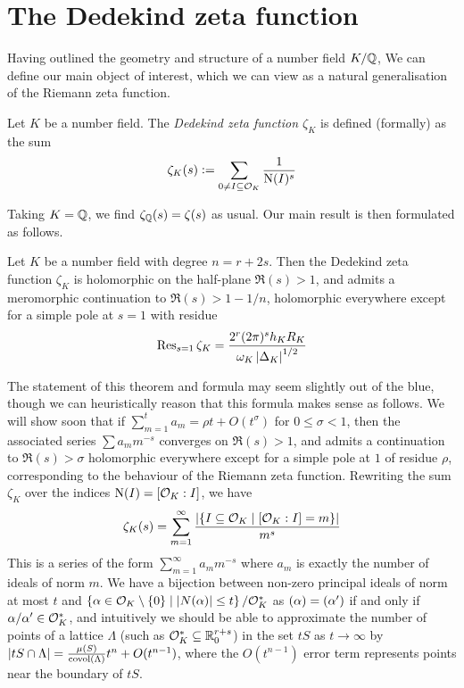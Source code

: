 \documentclass[11pt]{report}
\begin{document}
\section{The Dedekind zeta function}
Having outlined the geometry and structure of a number field $K / \mathbb{Q}$, We can define our main object of interest, which we can view as a natural generalisation of the Riemann zeta function.
\begin{definition}
    Let $K$ be a number field. The \emph{Dedekind zeta function $\zeta_K$} is defined (formally) as the sum
    $$
        \zeta_K(s) \vcentcolon= \sum_{0 \neq I \subseteq \mathcal{O}_K} \frac1{\operatorname{N}(I)^s}
    $$
\end{definition}
Taking $K = \mathbb{Q}$, we find $\zeta_{\mathbb{Q}}(s) = \zeta(s)$ as usual. Our main result is then formulated as follows.
\begin{theorem}\label{acnf1}
    Let $K$ be a number field with degree $n = r + 2s$. Then the Dedekind zeta function $\zeta_K$ is holomorphic on the half-plane $\Re(s) > 1$, and admits a meromorphic continuation to $\Re(s) > 1 - 1/n$, holomorphic everywhere except for a simple pole at $s = 1$ with residue
    $$
        \operatorname{Res}_{s = 1}\zeta_K = \frac{2^r(2\pi)^sh_KR_K}{\omega_K\left| \Delta_K \right|^{1/2}}
    $$
\end{theorem}
The statement of this theorem and formula may seem slightly out of the blue, though we can heuristically reason that this formula makes sense as follows. We will show soon that if $\sum_{m = 1}^t a_m = \rho t + O(t^\sigma)$ for $0 \leq \sigma < 1$, then the associated series $\sum a_mm^{-s}$ converges on $\Re(s) > 1$, and admits a continuation to $\Re(s) > \sigma$ holomorphic everywhere except for a simple pole at $1$ of residue $\rho$, corresponding to the behaviour of the Riemann zeta function. Rewriting the sum $\zeta_K$ over the indices $\operatorname{N}(I) = [\mathcal{O}_K : I]$, we have
\begin{align}\label{coeffs}
    \zeta_K(s) = \sum_{m = 1}^\infty \frac{\left| \left\{  I \subseteq \mathcal{O}_K \mid [\mathcal{O}_K : I] = m  \right\} \right|}{m^s}
\end{align}
This is a series of the form $\sum_{m = 1}^\infty a_mm^{-s}$ where $a_m$ is exactly the number of ideals of norm $m$. We have a bijection between non-zero principal ideals of norm at most $t$ and $\left\{  \alpha \in \mathcal{O}_K \setminus \left\{  0  \right\} \mid \left| N(\alpha) \right| \leq t  \right\} / \mathcal{O}_K^*$ as $(\alpha) = (\alpha')$ if and only if $\alpha/\alpha' \in \mathcal{O}_K^*$, and intuitively we should be able to approximate the number of points of a lattice $\Lambda$ (such as $\mathcal{O}_K^* \subseteq \mathbb{R}_0^{r + s}$) in the set $tS$ as $t \to \infty$ by $\left| tS \cap \Lambda \right| = \frac{\mu(S)}{\operatorname{covol}(\Lambda)}t^n + O(t^{n - 1})$, where the $O(t^{n - 1})$ error term represents points near the boundary of $tS$. 
\end{document}
